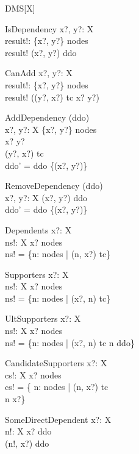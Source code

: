 \begin{class}{DMS}[X]
\begin{op}{IsDependency}
  x?, y?:  X  \\
  result!:  \bool  
\where
  \{x?, y?\} \subseteq nodes \\ 
  result! \iff (x?, y?) \in ddo 
\end{op}
\begin{op}{CanAdd}
  x?, y?:  X  \\
  result!:  \bool  
\where
  \{x?, y?\} \subseteq nodes \\ 
  result! \iff ((y?, x?) \notin tc \land x? \neq y?)
\end{op}
\begin{op}{AddDependency}
  \Delta (ddo)\\
  x?, y?:  X  
\where
  \{x?, y?\} \subseteq nodes \\
  x? \neq y? \\
  (y?, x?) \notin tc \\ 
  ddo' = ddo \cup \{(x?, y?)\}
\end{op}
\begin{op}{RemoveDependency}
  \Delta (ddo)\\
  x?, y?:  X  
\where
  (x?, y?) \in ddo \\ 
  ddo' = ddo \setminus \{(x?, y?)\}
\end{op}
\begin{op}{Dependents}
  x?:  X  \\
  ns!:  \finset  X  
\where
  x? \in nodes \\ 
  ns! = \{n: nodes | (n, x?) \in tc\}
\end{op}
\begin{op}{Supporters}
  x?:  X  \\
  ns!: \finset  X  
\where
  x? \in nodes \\ 
  ns! = \{n: nodes | (x?, n) \in tc\}
\end{op}
\begin{op}{UltSupporters}
  x?:  X  \\
  ns!: \finset  X  
\where
  x? \in nodes \\ 
  ns! = \{n: nodes | (x?, n) \in tc \land n \notin  \dom ddo\}
\end{op}
\begin{op}{CandidateSupporters}
  x?:  X  \\
  cs!:  \finset  X 
\where
  x? \in nodes \\ 
  cs! = \{ n: nodes | (n, x?) \notin tc \land \\ n \neq x?\}
\end{op}
\begin{op}{SomeDirectDependent}
  x?:  X  \\
  n!:  X  
\where
  x? \in  \ran ddo \\ 
  (n!, x?) \in ddo
\end{op} 
\end{class} 

